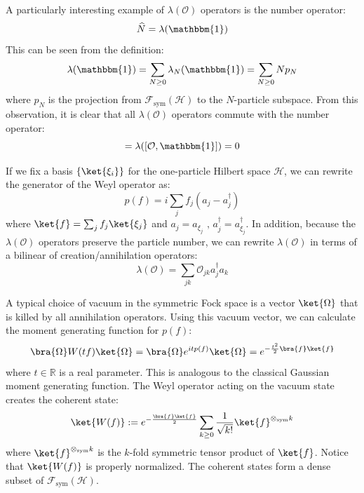 \documentclass[a4paper,11pt]{article}
\theoremstyle{definition}
\numberwithin{equation}{section}
\begin{document}
A particularly interesting example of $\lambda(\mathcal{O})$ operators is the number operator:
\begin{equation}
    \widehat{N}  = \lambda(\mathbbm{1})
\end{equation}
This can be seen from the definition:
\begin{equation}
    \lambda(\mathbbm{1}) = \sum_{N\geq 0}\lambda_N(\mathbbm{1}) = \sum_{N\geq 0}Np_{N}
\end{equation}
where $p_N$ is the projection from $\mathcal{F}_\text{sym}(\mathcal{H})$ to the $N$-particle subspace. From this observation, it is clear that all $\lambda(\mathcal{O})$ operators commute with the number operator:
\begin{equation}
    [\lambda(\mathcal{O}),\lambda(\mathbbm{1})] = \lambda([\mathcal{O},\mathbbm{1}]) = 0
\end{equation}

If we fix a basis $\{\ket{\xi_i}\}$ for the one-particle Hilbert space $\mathcal{H}$, we can rewrite the generator of the Weyl operator as:
\begin{equation}
    p(f) = i\sum_jf_j(a_j -a_j^\dagger)
\end{equation}
where $\ket{f} = \sum_j f_j\ket{\xi_j}$ and $a_j  = a_{\xi_j}\text{ , }a_j^\dagger = a_{\xi_j}^\dagger$. In addition, because the $\lambda(\mathcal{O})$ operators preserve the particle number, we can rewrite $\lambda(\mathcal{O})$ in terms of a bilinear of creation/annihilation operators:
\begin{equation}
    \lambda(\mathcal{O}) = \sum_{jk}\mathcal{O}_{jk}a^\dagger_ja_k
\end{equation}

A typical choice of vacuum in the symmetric Fock space is a vector $\ket{\Omega}$ that is killed by all annihilation operators. Using this vacuum vector, we can calculate the moment generating function for $p(f)$:
\begin{equation}\label{equation: moment}
    \bra{\Omega}W(tf)\ket{\Omega} = \bra{\Omega}e^{itp(f)}\ket{\Omega} = e^{-\frac{t^2}{2}\bra{f}\ket{f}}
\end{equation}
where $t\in\mathbb{R}$ is a real parameter. This is analogous to the classical Gaussian moment generating function. The Weyl operator acting on the vacuum state creates the coherent state:
\begin{equation}
    \ket{W(f)} := e^{-\frac{\bra{f}\ket{f}}{2}}\sum_{k\geq 0}\frac{1}{\sqrt{k!}}\ket{f}^{\otimes_\text{sym} k}
\end{equation}
where $\ket{f}^{\otimes_\text{sym} k}$ is the $k$-fold symmetric tensor product of $\ket{f}$. Notice that $\ket{W(f)}$ is properly normalized. The coherent states form a dense subset of $\mathcal{F}_\text{sym}(\mathcal{H})$. 
\end{document}
